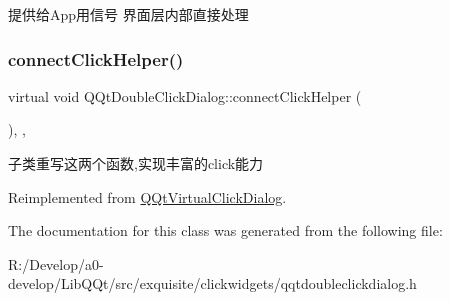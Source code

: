 提供给\+App用信号 界面层内部直接处理 \mbox{\label{class_q_qt_double_click_dialog_aeb530bd68159ea4833076b450cb5f4ca}} 
\subsubsection{\texorpdfstring{connect\+Click\+Helper()}{connectClickHelper()}}
{\footnotesize\ttfamily virtual void Q\+Qt\+Double\+Click\+Dialog\+::connect\+Click\+Helper (\begin{DoxyParamCaption}{ }\end{DoxyParamCaption})\hspace{0.3cm}{\ttfamily [inline]}, {\ttfamily [protected]}, {\ttfamily [virtual]}}

子类重写这两个函数,实现丰富的click能力 

Reimplemented from \mbox{\hyperlink{class_q_qt_virtual_click_dialog_a93e958d50ddc3fb38ca0e4905673cf74}{Q\+Qt\+Virtual\+Click\+Dialog}}.



The documentation for this class was generated from the following file\+:\begin{DoxyCompactItemize}
\item 
R\+:/\+Develop/a0-\/develop/\+Lib\+Q\+Qt/src/exquisite/clickwidgets/qqtdoubleclickdialog.\+h\end{DoxyCompactItemize}
